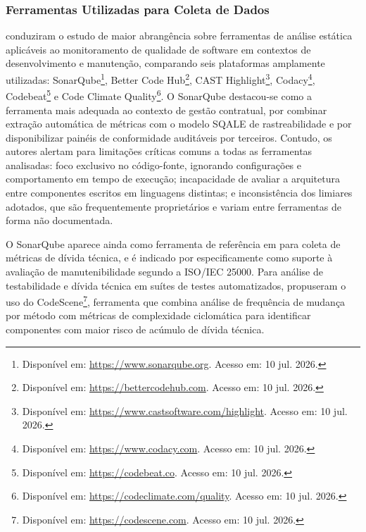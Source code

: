 \subsubsection{Ferramentas Utilizadas para Coleta de Dados}

 conduziram o estudo de maior abrangência sobre ferramentas de análise estática aplicáveis ao monitoramento de qualidade de software em contextos de desenvolvimento e manutenção, comparando seis plataformas amplamente utilizadas: SonarQube\footnote{Disponível em: \url{https://www.sonarqube.org}. Acesso em: 10 jul. 2026.}, Better Code Hub\footnote{Disponível em: \url{https://bettercodehub.com}. Acesso em: 10 jul. 2026.}, CAST Highlight\footnote{Disponível em: \url{https://www.castsoftware.com/highlight}. Acesso em: 10 jul. 2026.}, Codacy\footnote{Disponível em: \url{https://www.codacy.com}. Acesso em: 10 jul. 2026.}, Codebeat\footnote{Disponível em: \url{https://codebeat.co}. Acesso em: 10 jul. 2026.} e Code Climate Quality\footnote{Disponível em: \url{https://codeclimate.com/quality}. Acesso em: 10 jul. 2026.}. O SonarQube destacou-se como a ferramenta mais adequada ao contexto de gestão contratual, por combinar extração automática de métricas com o modelo SQALE de rastreabilidade e por disponibilizar painéis de conformidade auditáveis por terceiros. Contudo, os autores alertam para limitações críticas comuns a todas as ferramentas analisadas: foco exclusivo no código-fonte, ignorando configurações e comportamento em tempo de execução; incapacidade de avaliar a arquitetura entre componentes escritos em linguagens distintas; e inconsistência dos limiares adotados, que são frequentemente proprietários e variam entre ferramentas de forma não documentada.

O SonarQube aparece ainda como ferramenta de referência em  para coleta de métricas de dívida técnica, e é indicado por  especificamente como suporte à avaliação de manutenibilidade segundo a ISO/IEC 25000. Para análise de testabilidade e dívida técnica em suítes de testes automatizados,  propuseram o uso do CodeScene\footnote{Disponível em: \url{https://codescene.com}. Acesso em: 10 jul. 2026.}, ferramenta que combina análise de frequência de mudança por método com métricas de complexidade ciclomática para identificar componentes com maior risco de acúmulo de dívida técnica.

